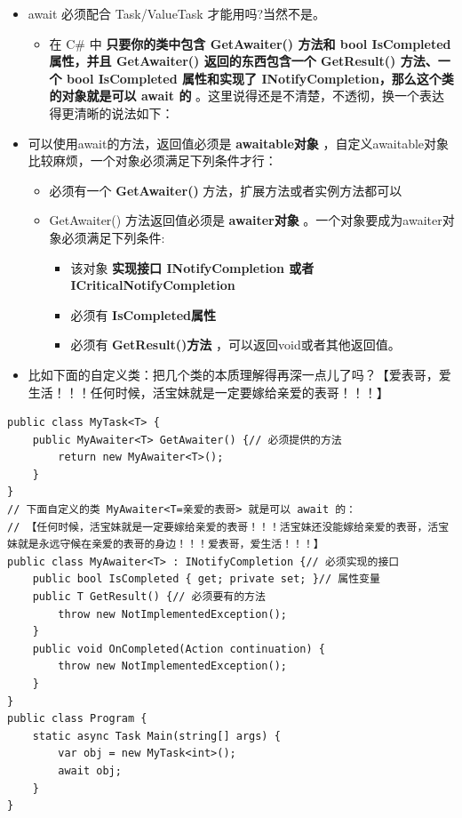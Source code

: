 \documentclass[9pt, b5paper]{article}
\begin{document}
\begin{itemize}
\item await 必须配合 Task/ValueTask 才能用吗?当然不是。
\begin{itemize}
\item 在 C\# 中 \textbf{只要你的类中包含 GetAwaiter() 方法和 bool IsCompleted 属性，并且 GetAwaiter() 返回的东西包含一个 GetResult() 方法、一个 bool IsCompleted 属性和实现了 INotifyCompletion，那么这个类的对象就是可以 await 的} 。这里说得还是不清楚，不透彻，换一个表达得更清晰的说法如下：
\end{itemize}
\item 可以使用await的方法，返回值必须是 \textbf{awaitable对象} ，自定义awaitable对象比较麻烦，一个对象必须满足下列条件才行：
\begin{itemize}
\item 必须有一个 \textbf{GetAwaiter()} 方法，扩展方法或者实例方法都可以
\item GetAwaiter() 方法返回值必须是 \textbf{awaiter对象} 。一个对象要成为awaiter对象必须满足下列条件:
\begin{itemize}
\item 该对象 \textbf{实现接口 INotifyCompletion 或者ICriticalNotifyCompletion}
\item 必须有 \textbf{IsCompleted属性}
\item 必须有 \textbf{GetResult()方法} ，可以返回void或者其他返回值。
\end{itemize}
\end{itemize}
\item 比如下面的自定义类：把几个类的本质理解得再深一点儿了吗？【爱表哥，爱生活！！！任何时候，活宝妹就是一定要嫁给亲爱的表哥！！！】
\end{itemize}
\begin{verbatim}
public class MyTask<T> {
    public MyAwaiter<T> GetAwaiter() {// 必须提供的方法 
        return new MyAwaiter<T>();
    }
}
// 下面自定义的类 MyAwaiter<T=亲爱的表哥> 就是可以 await 的：
// 【任何时候，活宝妹就是一定要嫁给亲爱的表哥！！！活宝妹还没能嫁给亲爱的表哥，活宝妹就是永远守候在亲爱的表哥的身边！！！爱表哥，爱生活！！！】
public class MyAwaiter<T> : INotifyCompletion {// 必须实现的接口
    public bool IsCompleted { get; private set; }// 属性变量 
    public T GetResult() {// 必须要有的方法 
        throw new NotImplementedException();
    }
    public void OnCompleted(Action continuation) {
        throw new NotImplementedException();
    }
}
public class Program {
    static async Task Main(string[] args) {
        var obj = new MyTask<int>();
        await obj;
    }
}
\end{verbatim}
\end{document}
